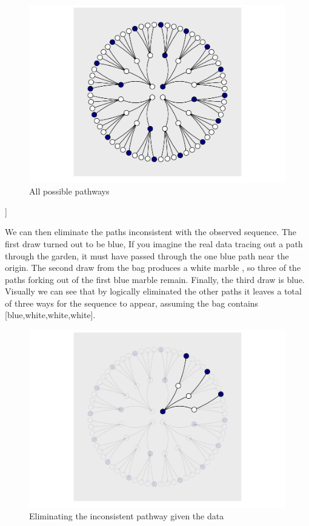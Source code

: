 \documentclass{article}
\begin{document}
\begin{figure}

{\centering \includegraphics{qrap_paper_files/figure-latex/forking_paths-1} 

}

\caption{All possible pathways}\label{fig:forking_paths}
\end{figure}

{]}

We can then eliminate the paths inconsistent with the observed sequence.
The first draw turned out to be blue, If you imagine the real data
tracing out a path through the garden, it must have passed through the
one blue path near the origin. The second draw from the bag produces a
white marble , so three of the paths forking out of the first blue
marble remain. Finally, the third draw is blue. Visually we can see that
by logically eliminated the other paths it leaves a total of three ways
for the sequence to appear, assuming the bag contains
{[}blue,white,white,white{]}.

\begin{figure}

{\centering \includegraphics{qrap_paper_files/figure-latex/unnamed-chunk-1-1} 

}

\caption{Eliminating the inconsistent pathway given the data}\label{fig:unnamed-chunk-1}
\end{figure}
\end{document}
